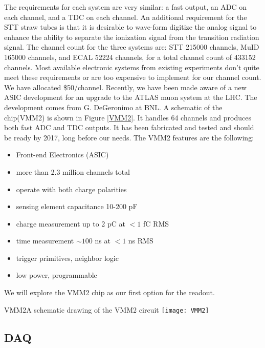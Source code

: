 The requirements for each system are very similar: a fast output, an ADC on each channel, 
and a TDC on each channel.  An additional requirement for the STT straw tubes is that it 
is desirable to wave-form digitize the analog signal to enhance the ability to separate 
the ionization signal from the transition radiation signal.  The channel count for the 
three systems are: STT 215000 channels, MuID 165000 channels, and ECAL 52224 channels, 
for a total channel count  of 433152 channels.   Most available electronic systems from 
existing experiments don’t quite meet these requirements or are too expensive to implement 
for our channel count.  We have allocated \$50/channel.  Recently, we have been made aware 
of a new ASIC development for an upgrade to the ATLAS muon system at the LHC.  The 
development comes from G. DeGeronimo at BNL.  A schematic of the chip(VMM2) is shown in 
Figure \ref{VMM2}.  It handles 64 channels and produces both fast ADC and TDC outputs.
It has been fabricated and tested and should be ready by 2017, long before our needs.  
The VMM2 features are the following:
\begin{itemize}
\item Front-end Electronics (ASIC)
\item more than 2.3 million channels total
\item operate with both charge polarities
\item sensing element capacitance 10-200 pF
\item charge measurement up to 2 pC at $< 1$ fC RMS
\item time measurement $\sim 100$ ns at $< 1$ ns RMS
\item trigger primitives, neighbor logic
\item low power, programmable
\end{itemize}
We will explore the VMM2 chip as our first option for the readout.  


\begin{cdrfigure}{VMM2}{A schematic drawing of the VMM2 circuit}
\texttt{[image: VMM2]}
\end{cdrfigure}


\subsection{DAQ}

